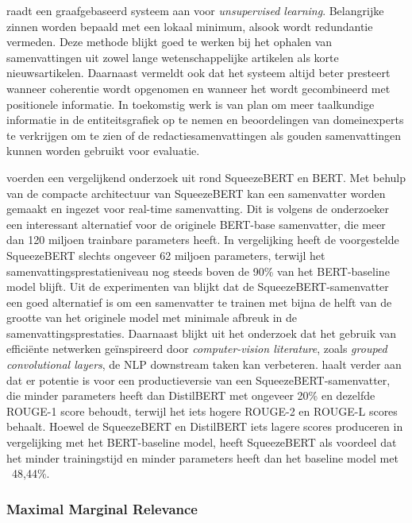 \textcite{Parveen2015} raadt een graafgebaseerd systeem aan voor \textit{unsupervised learning}. Belangrijke zinnen worden bepaald met een lokaal minimum, alsook wordt redundantie vermeden. Deze methode blijkt goed te werken bij het ophalen van samenvattingen uit zowel lange wetenschappelijke artikelen als korte nieuwsartikelen. Daarnaast vermeldt \textcite{Parveen2015} ook dat het systeem altijd beter presteert wanneer coherentie wordt opgenomen en wanneer het wordt gecombineerd met positionele informatie. In toekomstig werk is \textcite{Parveen2015} van plan om meer taalkundige informatie in de entiteitsgrafiek op te nemen en beoordelingen van domeinexperts te verkrijgen om te zien of de redactiesamenvattingen als gouden samenvattingen kunnen worden gebruikt voor evaluatie.

\textcite{AbdelSalam2022} voerden een vergelijkend onderzoek uit rond SqueezeBERT en BERT. Met behulp van de compacte architectuur van SqueezeBERT kan een samenvatter worden gemaakt en ingezet voor real-time samenvatting. Dit is volgens de onderzoeker een interessant alternatief voor de originele BERT-base samenvatter, die meer dan 120 miljoen trainbare parameters heeft. In vergelijking heeft de voorgestelde SqueezeBERT slechts ongeveer 62 miljoen parameters, terwijl het samenvattingsprestatieniveau nog steeds boven de 90\% van het BERT-baseline model blijft. Uit de experimenten van \textcite{AbdelSalam2022} blijkt dat de SqueezeBERT-samenvatter een goed alternatief is om een samenvatter te trainen met bijna de helft van de grootte van het originele model met minimale afbreuk in de samenvattingsprestaties. Daarnaast blijkt uit het onderzoek dat het gebruik van efficiënte netwerken geïnspireerd door \textit{computer-vision literature}, zoals \textit{grouped convolutional layers}, de NLP downstream taken kan verbeteren.  \textcite{AbdelSalam2022} haalt verder aan dat er potentie is voor een productieversie van een SqueezeBERT-samenvatter, die minder parameters heeft dan DistilBERT met ongeveer 20\% en dezelfde ROUGE-1 score behoudt, terwijl het iets hogere ROUGE-2 en ROUGE-L scores behaalt. Hoewel de SqueezeBERT en DistilBERT iets lagere scores produceren in vergelijking met het BERT-baseline model, heeft SqueezeBERT als voordeel dat het minder trainingstijd en minder parameters heeft dan het baseline model met ~48,44\%. 

\subsubsection{Maximal Marginal Relevance}

